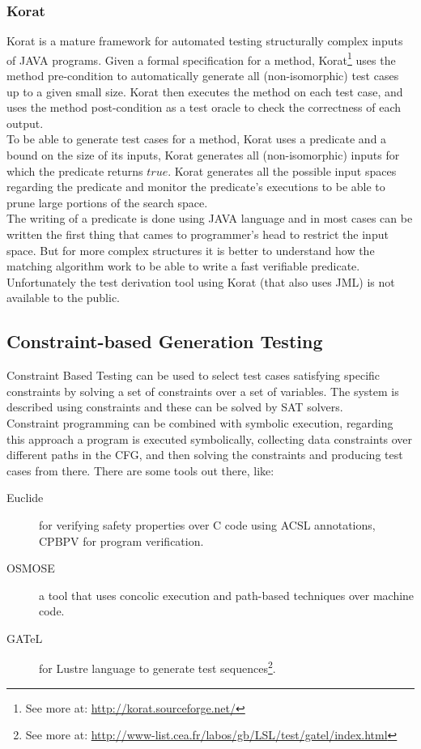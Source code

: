 \subsubsection{Korat}
Korat\cite{Boyapati02korat:automated} is a mature framework for automated testing structurally complex inputs of JAVA programs.
Given a formal specification for a method, Korat\footnote{See more at: \url{http://korat.sourceforge.net/}} uses the method pre-condition
to automatically generate all (non-isomorphic) test cases up to a given small size.
Korat then executes the method on each test case, and uses the method post-condition as a test oracle to check the correctness of each output.\\
To be able to generate test cases for a method, Korat uses a predicate and a bound on the size of its inputs,
Korat generates all (non-isomorphic) inputs for which the predicate returns $true$.
Korat generates all the possible input spaces regarding the predicate and monitor the predicate's executions to be able to prune large portions of the search space.\\
\indent The writing of a predicate is done using JAVA language and in most cases can be written the first thing that cames to programmer's head to restrict the input space.
But for more complex structures it is better to understand how the matching algorithm work to be able to write a fast verifiable predicate.\\
Unfortunately the test derivation tool using Korat (that also uses \ac{JML}) is not available to the public.

\subsection{Constraint-based Generation Testing}
Constraint Based Testing\cite{DeMillo91constraint-basedautomatic} can be used to select test cases satisfying specific constraints by
solving a set of constraints over a set of variables. The system is described using constraints and these can be solved by \ac{SAT} solvers.\\
Constraint programming can be combined with symbolic execution, regarding this approach a program is executed symbolically,
collecting data constraints over different paths in the \ac{CFG}, and then solving the constraints and producing test cases from there.
There are some tools out there, like:

\begin{description}
\item[Euclide] for verifying safety properties over C code using \ac{ACSL} annotations, CPBPV for program verification.
\item[OSMOSE] a tool that uses concolic execution and path-based techniques over machine code.
\item[GATeL] for Lustre language to generate test sequences\footnote{See more at: \url{http://www-list.cea.fr/labos/gb/LSL/test/gatel/index.html}}.
\end{description}

